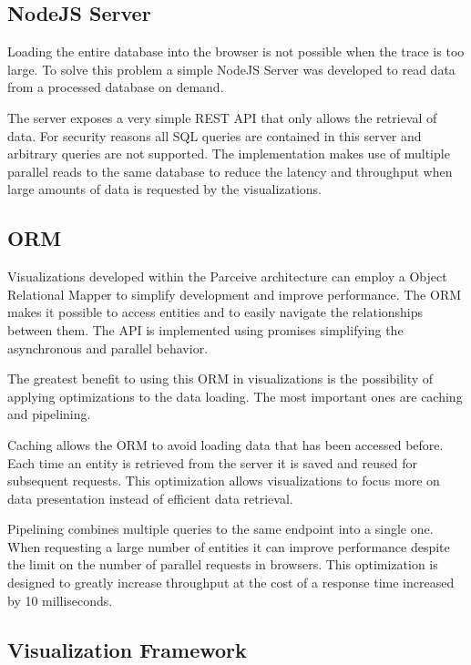 \documentclass[conference]{IEEEtran}
\begin{document}
\subsection{NodeJS Server}

Loading the entire database into the browser is not possible when the trace is too large. To solve this problem a simple NodeJS Server was developed to read data from a processed database on demand.

The server exposes a very simple REST \cite{rest} API that only allows the retrieval of data. For security reasons all SQL queries are contained in this server and  arbitrary queries are not supported. The implementation makes use of multiple parallel reads to the same database to reduce the latency and throughput when large amounts of data is requested by the visualizations.

\subsection{ORM}

Visualizations developed within the Parceive architecture can employ a Object Relational Mapper to simplify development and improve performance. The ORM makes it possible to access entities and to easily navigate the relationships between them. The API is implemented using promises \cite{promises} simplifying the asynchronous and parallel behavior.

The greatest benefit to using this ORM in visualizations is the possibility of applying optimizations to the data loading. The most important ones are caching and pipelining.

Caching allows the ORM to avoid loading data that has been accessed before. Each time an entity is retrieved from the server it is saved and reused for subsequent requests. This optimization allows visualizations to focus more on data presentation instead of efficient data retrieval.

Pipelining combines multiple queries to the same endpoint into a single one. When requesting a large number of entities it can improve performance despite the limit on the number of parallel requests in browsers. This optimization is designed to greatly increase throughput at the cost of a response time increased by 10 milliseconds.

\subsection{Visualization Framework}
\end{document}
